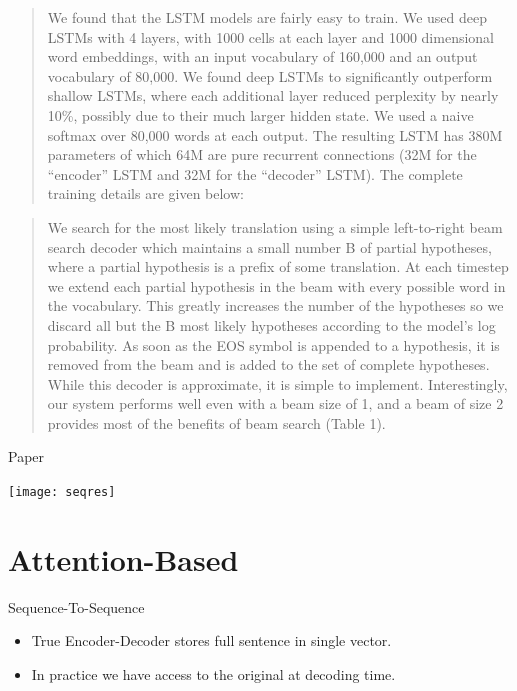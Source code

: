 \documentclass{beamer}
\begin{document}
\begin{frame}
  \begin{quote}
    We found that the LSTM models are fairly easy to train. We used
    deep LSTMs with 4 layers, with 1000 cells at each layer and 1000
    dimensional word embeddings, with an input vocabulary of 160,000
    and an output vocabulary of 80,000. We found deep LSTMs to
    significantly outperform shallow LSTMs, where each additional
    layer reduced perplexity by nearly 10\%, possibly due to their
    much larger hidden state. We used a naive softmax over 80,000
    words at each output. The resulting LSTM has 380M parameters of
    which 64M are pure recurrent connections (32M for the “encoder”
    LSTM and 32M for the “decoder” LSTM). The complete training
    details are given below:
  \end{quote}
\end{frame}

\begin{frame}
  \begin{quote}
    We search for the most likely translation using a simple left-to-right beam search decoder which
maintains a small number B of partial hypotheses, where a partial hypothesis is a prefix of some
translation. At each timestep we extend each partial hypothesis in the beam with every possible
word in the vocabulary. This greatly increases the number of the hypotheses so we discard all but
the B most likely hypotheses according to the model’s log probability. As soon as the EOS
symbol is appended to a hypothesis, it is removed from the beam and is added to the set of complete
hypotheses. While this decoder is approximate, it is simple to implement. Interestingly, our system
performs well even with a beam size of 1, and a beam of size 2 provides most of the benefits of beam
search (Table 1).
  \end{quote}
\end{frame}

\begin{frame}{Paper}
  \begin{center}
    \texttt{[image: seqres]}
  \end{center}
\end{frame}


\section{Attention-Based}

\begin{frame}{Sequence-To-Sequence}
  \begin{itemize}
  \item True Encoder-Decoder stores full sentence in single vector.
    \air 
  \item In practice we have access to the original at decoding time. 
   
  \end{itemize}
\end{frame}
\end{document}
